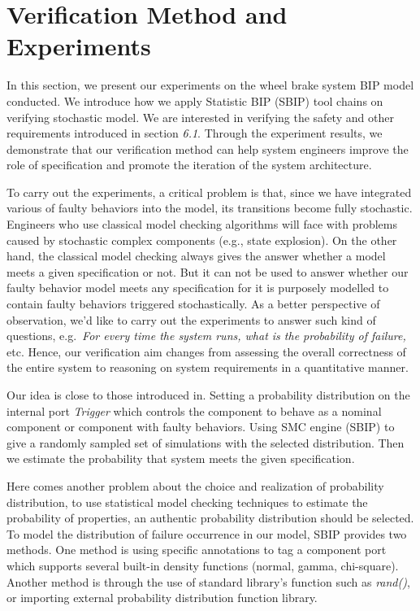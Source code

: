 

\section{Verification Method and Experiments}

In this section, we present our experiments on the wheel brake system BIP model conducted. We introduce how we apply Statistic BIP (SBIP) tool chains on verifying stochastic model. We are interested in verifying the safety and other requirements introduced in section \emph{6.1}.
Through the experiment results, we demonstrate that our verification method can help system engineers improve the role of specification and promote the iteration of the system architecture.

To carry out the experiments, a critical problem is that, since we have integrated various of faulty behaviors into the model, its transitions become fully stochastic. Engineers who use classical model checking algorithms will face with problems caused by stochastic complex components (e.g., state explosion). On the other hand, the classical model checking always gives the answer whether a model meets a given specification or not. But it can not be used to answer whether our faulty behavior model meets any specification for it is purposely modelled to contain faulty behaviors triggered stochastically.
As a better perspective of observation, we'd like to carry out the experiments to answer such kind of questions, e.g.\ \emph{For every time the system runs, what is the probability of failure,} etc. Hence, our verification aim changes from assessing the overall correctness of the entire system to reasoning on system requirements in a quantitative manner.

Our idea is close to those introduced in\cite{smc10,smc10'}. Setting a probability distribution on the internal port \emph{Trigger} which controls the component to behave as a nominal component or component with faulty behaviors. Using SMC engine (SBIP) to give a randomly sampled set of simulations with the selected distribution. Then we estimate the probability that system meets the given specification. 

Here comes another problem about the choice and realization of probability distribution, to use statistical model checking techniques to estimate the probability of properties, an authentic probability distribution should be selected. To model the distribution of failure occurrence in our model, SBIP provides two methods. One method is using specific annotations to tag a component port which supports several built-in density functions (normal, gamma, chi-square). Another method is through the use of standard library's function such as \emph{rand()}, or importing external probability distribution function library.


